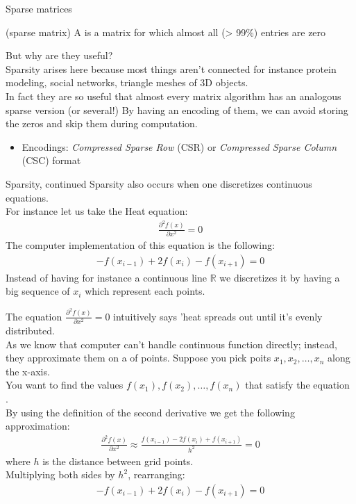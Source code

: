 \begin{parag}{Sparse matrices}
		\begin{definition}(sparse matrix)
		A  is a matrix for which almost all (> 99\%) entries are zero
		\end{definition}
		But why are they useful?\\
		Sparsity arises here because most things aren't connected for instance protein modeling, social networks, triangle meshes of 3D objects.\\
		In fact they are so useful that almost every matrix algorithm has an analogous sparse version (or several!) By having an encoding of them, we can avoid storing the zeros and skip them during computation.
		\begin{itemize}
			\item Encodings: \textit{Compressed Sparse Row} (CSR) or \textit{Compressed Sparse Column} (CSC) format
		\end{itemize}
		\begin{subparag}{Sparsity, continued}
		    Sparsity also occurs when one discretizes continuous equations.\\
			For instance let us take the Heat equation:
			\begin{align*} \frac{\partial^2 f\left(x\right)}{\partial x^2} = 0 \end{align*}
			The computer implementation of this equation is the following:
			\begin{align*} -f(x_{i-1})  + 2f(x_i) - f(x_{i + 1}) = 0\end{align*} 
			Instead of having for instance a continuous line $ \mathbb{R}$ we discretizes it by having a big sequence of $x_i$ which represent each points.
			\begin{framedremark}
			The equation $\frac{\partial^2 f\left(x\right)}{\partial x^2} = 0$ intuitively says 'heat spreads out until it's evenly distributed.\\
			As we know that computer can't handle continuous function directly; instead, they approximate them on a  of  points. Suppose you pick poits $x_1, x_2, \ldots, x_n$ along the x-axis.\\
			You want to find the values $f\left(x_1\right), f\left(x_2\right), \ldots, f\left(x_n\right)$ that satisfy the equation .\\
			By using the definition of the second derivative we get the following approximation:
			\begin{align*}\frac{\partial^2 f\left(x\right)}{\partial x^2}  \approx \frac{f(x_{i-1}) - 2f(x_i) + f(x_{i+1})}{h^2}  = 0 \end{align*}
			where $h$ is the distance between grid points.\\
			Multiplying both sides by $h^2$, rearranging:
			\begin{align*} -f(x_{i-1})  + 2f(x_i) - f(x_{i + 1}) = 0\end{align*} 

			\end{framedremark}
		\end{subparag}
\end{parag}

